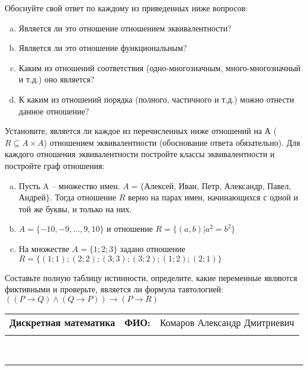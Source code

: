 \documentclass[10pt]{exam}
\newcommand{\class}{Дискретная математика}
\newcommand{\examdate}{}
\begin{document}
\begin{questions}
Обоснуйте свой ответ по каждому из приведенных ниже вопросов:
\begin{enumerate} [a)]\setcounter{enumi}{0}
    \item Является ли это отношение отношением эквивалентности?
    \item Является ли это отношение функциональным?
    \item Каким из отношений соответствия (одно-многозначным, много-многозначный и т.д.) оно является?
    \item К каким из отношений порядка (полного, частичного и т.д.) можно отнести данное отношение?
\end{enumerate}
\question
Установите, является ли каждое из перечисленных ниже отношений на А ($R \subseteq A \times A$) отношением эквивалентности (обоснование ответа обязательно). Для каждого отношения эквивалентности постройте классы 
эквивалентности и постройте граф отношения:
\begin{enumerate} [a)]\setcounter{enumi}{0}
\item Пусть A – множество имен. $A = \{ $Алексей, Иван, Петр, Александр, Павел, Андрей$ \}$. Тогда отношение $R$ верно на парах имен, начинающихся с одной и той же буквы, и только на них.
\item $A = \{-10, -9, … , 9, 10\}$ и отношение $ R = \{(a,b)|a^{2} = b^{2}\}$
\item На множестве $A = \{1; 2; 3\}$ задано отношение $R = \{(1; 1); (2; 2); (3; 3); (3; 2); (1; 2); (2; 1)\}$
\end{enumerate}\question Составьте полную таблицу истинности, определите, какие переменные являются фиктивными и проверьте, является ли формула тавтологией:
$(( P \rightarrow Q) \land (Q \rightarrow P)) \rightarrow (P \rightarrow R)$

\end{questions}
\newpage
\begin{flushright}
\begin{tabular}{p{2.8in} r l}
\textbf{\class} & \textbf{ФИО:} &Комаров Александр Дмитриевич
\\

\textbf{\examdate} &&\\
\end{tabular}\\
\end{flushright}
\rule[1ex]{\textwidth}{.1pt}
\end{document}
